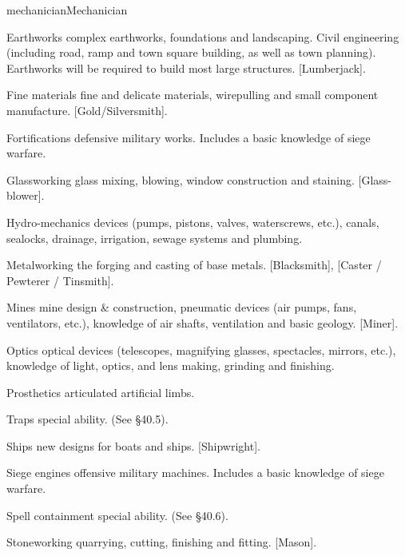 \begin{Skill}[2.2]{mechanician}{Mechanician}
\begin{Description}
\item[Earthworks] complex earthworks, foundations and landscaping.
  Civil engineering (including road, ramp and town square building, as
  well as town planning).  Earthworks will be required to build most
  large structures. [Lumberjack].

\item[Fine] materials fine and delicate materials, wirepulling and
  small component manufacture.  [Gold/Silversmith].

\item[Fortifications] defensive military works. Includes a basic
  knowledge of siege warfare.

\item[Glassworking] glass mixing, blowing, window construction and
  staining. [Glass-blower].

\item[Hydro-mechanics] devices (pumps, pistons, valves, waterscrews,
  etc.), canals, sealocks, drainage, irrigation, sewage systems and
  plumbing.

\item[Metalworking] the forging and casting of base metals.
  [Blacksmith], [Caster / Pewterer / Tinsmith].

\item[Mines] mine design \& construction, pneumatic devices (air
  pumps, fans, ventilators, etc.), knowledge of air shafts,
  ventilation and basic geology.  [Miner].

\item[Optics] optical devices (telescopes, magnifying glasses,
  spectacles, mirrors, etc.), knowledge of light, optics, and lens
  making, grinding and finishing.

\item[Prosthetics] articulated artificial limbs. 

\item[Traps] special ability. (See §40.5). 

\item[Ships] new designs for boats and ships.  [Shipwright].

\item[Siege] engines offensive military machines.  Includes a basic
  knowledge of siege warfare.

\item[Spell containment] special ability. (See §40.6).

\item[Stoneworking] quarrying, cutting, finishing and
  fitting. [Mason].


\end{Description}
\end{Skill}
